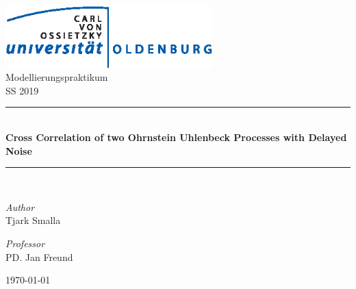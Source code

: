 \documentclass[a4paper,12pt]{book}
\theoremstyle{break}
\begin{document}

\begin{titlepage}
\begin{center}

\includegraphics[width=0.6\textwidth]{uol}\\[1cm]

{\large Modellierungspraktikum}\\[0.5cm]

{\large SS 2019}\\[0.5cm]

\rule{\linewidth}{0.5mm} \\[0.4cm]
{ \huge \bfseries Cross Correlation of two Ohrnstein Uhlenbeck Processes with Delayed Noise \\[0.4cm] }
\rule{\linewidth}{0.5mm} \\[1.5cm]

\noindent
\begin{minipage}{0.4\textwidth}
  \begin{flushleft} \large
    \emph{Author}\\
    Tjark Smalla\\
  \end{flushleft}
\end{minipage}%
\begin{minipage}{0.4\textwidth}
  \begin{flushright} \large
    \emph{Professor} \\
    PD. Jan Freund
  \end{flushright}
\end{minipage}

\vfill

{\large \today}

\end{center}
\end{titlepage}


\frontmatter

\tableofcontents

\clearpage
\listoffigures
\end{document}
